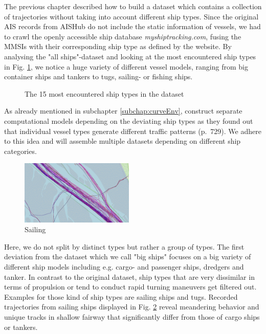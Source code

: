 The previous chapter described how to build a dataset which contains a collection of trajectories without taking into account different ship types. Since the original AIS records from AISHub do not include the static information of vessels, we had to crawl the openly accessible ship database \textit{myshiptracking.com}, fusing the MMSIs with their corresponding ship type as defined by the website. By analysing the "all ships"-dataset and looking at the most encountered ship types in Fig. \ref{fig:shipTypes}, we notice a huge variety of different vessel models, ranging from big container ships and tankers to tugs, sailing- or fishing ships.

\begin{figure}[H]
    \centering
    
    \caption{The 15 most encountered ship types in the dataset}
    \label{fig:shipTypes}
\end{figure}

As already mentioned in subchapter \ref{subchap:curveEnv}, \cite{venskus2021unsupervised} construct separate computational models depending on the deviating ship types as they found out that individual vessel types generate different traffic patterns (p.~729). We adhere to this idea and will assemble multiple datasets depending on different ship categories.
\begin{figure}
    \includegraphics[width=0.48\textwidth]{images/ais/tracks/Sailing.png}
    \caption{Sailing}
    \label{fig:sailing}
\end{figure}
Here, we do not split by distinct types but rather a group of types. The first deviation from the dataset which we call "big ships" focuses on a big variety of different ship models including e.g. cargo- and passenger ships, dredgers and tanker.
In contrast to the original dataset, ship types that are very dissimilar in terms of propulsion or tend to conduct rapid turning maneuvers get filtered out. Examples for those kind of ship types are sailing ships and tugs. Recorded trajectories from sailing ships displayed in Fig. \ref{fig:sailing} reveal meandering behavior and unique tracks in shallow fairway that significantly differ from those of cargo ships or tankers.

